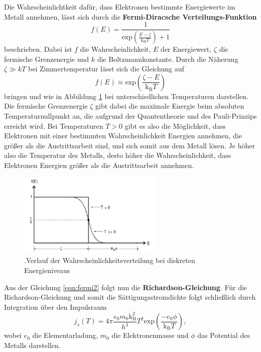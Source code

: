 Die Wahrscheinlichtkeit dafür, dass Elektronen bestimmte Energiewerte im Metall annehmen, lässt sich durch die \textbf{Fermi-Diracsche Verteilungs-Funktion}
\begin{equation}
    \label{eqn:fermi}
    f (E) = \frac{1}{\text{exp} \left (\frac{E - \zeta}{\text{k}_\text{B} T} \right) + 1}
\end{equation}
beschrieben.
Dabei ist $f$ die Wahrscheinlichkeit, $E$ der Energiewert, $\zeta$ die fermische Grenzenergie und $k$ die Boltzmannkonstante.
Durch die Näherung $\zeta \gg kT$ bei Zimmertemperatur lässt sich die Gleichung auf
\begin{equation}
    \label{eqn:fermi2}
    f (E) \approx \text{exp} \left( \frac{\zeta - E}{\text{k}_\text{B} T}\right)
\end{equation}
bringen und wie in Abbildung \ref{fig:fermi} bei unterschiedlichen Temperaturen darstellen.
Die fermische Grenzenergie $\zeta$ gibt dabei die maximale Energie beim absoluten Temperaturnullpunkt an, die aufgrund der Quantentheorie und des Pauli-Prinzips erreicht wird.
Bei Temperaturen $T > 0$ gibt es also die Möglichkeit, dass Elektronen mit einer bestimmten Wahrscheinlichkeit Energien annehmen, die größer als die Austrittsarbeit sind, und sich somit aus dem Metall lösen.
Je höher also die Temperatur des Metalls, desto höher die Wahrscheinlichkeit, dass Elektronen Energien größer als die Austrittsarbeit annehmen.
\begin{figure}[h]
    \centering
    \includegraphics[height=4cm]{Theorie/Fermi.png}
    \caption{.Verlauf der Wahrscheinlichkeitsverteilung bei diskreten Energieniveaus}
    \label{fig:fermi}
\end{figure}
Aus der Gleichung \ref{eqn:fermi2} folgt nun die \textbf{Richardson-Gleichung}.
Für die Richardson-Gleichung und somit die Sättigungsstromdichte folgt schließlich durch Integration über den Impulsraum
\begin{equation}
    \label{eqn:rich}
    j_s (T) = 4\pi \frac{e_0 m_0 \text{k}_\text{B}^{2}}{h^{3}} T^{2} \text{exp} \left(\frac{-e_0 \phi}{\text{k}_\text{B} T}\right),
\end{equation}
wobei $e_0$ die Elementarladung, $m_0$ die Elektronenmasse und $\phi$ das Potential des Metalls darstellen.


